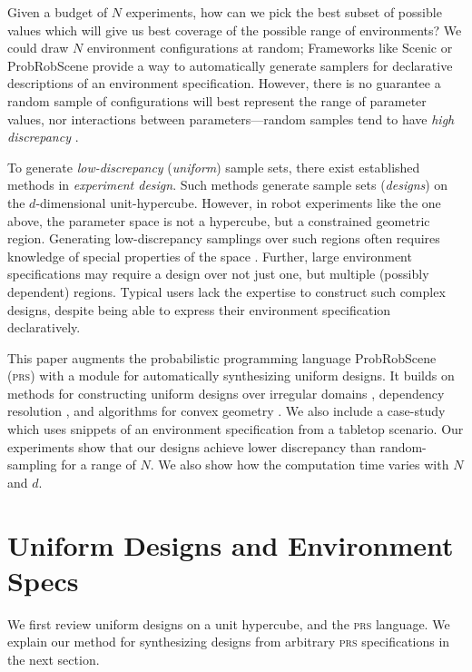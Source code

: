 \documentclass[sigplan, screen]{acmart} %
\begin{document}
Given a budget of $N$ experiments, how can we pick the best subset of possible values which will give us best coverage of the possible range of environments? We could draw $N$ environment configurations at random; Frameworks like Scenic \cite{fremont2018scenic} or ProbRobScene \cite{innes2020probrobscene}  provide a way to automatically generate samplers for declarative descriptions of an environment specification. However, there is no guarantee a random sample of configurations will best represent the range of parameter values, nor interactions between parameters---random samples tend to have \emph{high discrepancy} \cite{garud2017design}.

To generate \emph{low-discrepancy} (\emph{uniform}) sample sets, there exist established methods in \emph{experiment design}. Such methods generate sample sets (\emph{designs}) on the $d$-dimensional unit-hypercube. However, in robot experiments like the one above, the parameter space is not a hypercube, but a constrained geometric region. Generating low-discrepancy samplings over such regions often requires knowledge of special properties of the space \cite{tian2009uniform}. Further, large environment specifications may require a design over not just one, but multiple (possibly dependent) regions. Typical users lack the expertise to construct such complex designs, despite being able to express their environment specification declaratively.

This paper augments the probabilistic programming language ProbRobScene (\textsc{prs}) \cite{innes2020probrobscene} with a module for automatically synthesizing uniform designs. It builds on methods for constructing uniform designs over irregular domains \cite{zhang2020construction}, dependency resolution \cite{fremont2018scenic}, and algorithms for convex geometry \cite{innes2020probrobscene}. We also include a case-study which uses snippets of an environment specification from a tabletop scenario. Our experiments show that our designs achieve lower discrepancy than random-sampling for a range of $N$. We also show how the computation time varies with $N$ and $d$.

\section{Uniform Designs and Environment Specs}

We first review uniform designs on a unit hypercube, and the \textsc{prs} language. We explain our method for synthesizing designs from arbitrary \textsc{prs} specifications in the next section.
\end{document}
